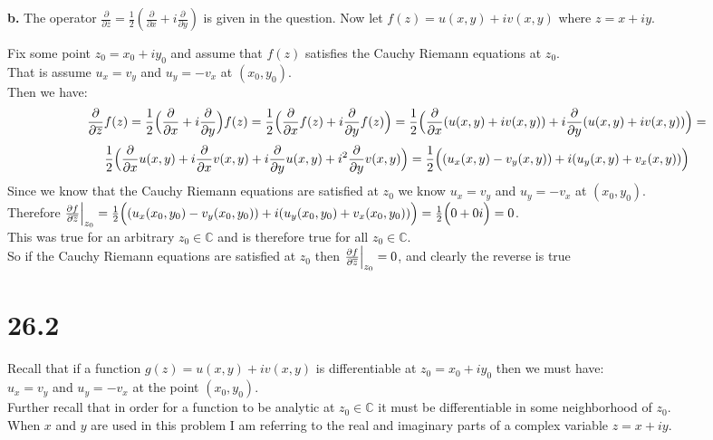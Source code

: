 \documentclass{article}
\begin{document}
{\Large\textbf{b.}} The operator $\frac{\partial}{\partial\overline{z}} =\frac{1}{2} (\frac{\partial}{\partial x} + i\frac{\partial}{\partial y})$ is given in the question. Now let $f(z) = u(x, y) + iv(x, y)$ where $z = x + iy$.
\begin{center}
    \doublespacing
    Fix some point $z_0 = x_0 + iy_0$ and assume that $f(z)$ satisfies the Cauchy Riemann equations at $z_0$.
    \\That is assume $u_x = v_y$ and $u_y = -v_x$ at $(x_0, y_0)$.
    \\Then we have:
    \[\frac{\partial}{\partial\overline{z}} f(z) =\frac{1}{2} \Big{(}\frac{\partial}{\partial x} + i\frac{\partial}{\partial y}\Big{)} f(z) =\frac{1}{2} \Big{(}\frac{\partial}{\partial x} f(z) + i\frac{\partial}{\partial y} f(z)\Big{)} =\frac{1}{2} \Big{(}\frac{\partial}{\partial x} (u(x, y) + iv(x, y)) + i\frac{\partial}{\partial y} (u(x, y) + iv(x, y))\Big{)} =\]
    \[\frac{1}{2} \Big{(}\frac{\partial}{\partial x} u(x, y) + i\frac{\partial}{\partial x}v(x, y) + i\frac{\partial}{\partial y} u(x, y) + i^2\frac{\partial}{\partial y}v(x, y)\Big{)} =\frac{1}{2} \Big{(}(u_x(x, y) - v_y (x, y)) + i(u_y(x, y) + v_x(x, y))\Big{)}\]
    Since we know that the Cauchy Riemann equations are satisfied at $z_0$ we know $u_x = v_y$ and $u_y = -v_x$ at $(x_0, y_0)$.
    \\Therefore $\frac{\partial f}{\partial\overline{z}}\Big{|}_{z_0} =\frac{1}{2} \Big{(}(u_x(x_0, y_0) - v_y (x_0, y_0)) + i(u_y(x_0, y_0) + v_x(x_0, y_0))\Big{)} =\frac{1}{2} \Big{(}0 + 0i\Big{)} = 0$.
    \\This was true for an arbitrary $z_0\in\mathbb{C}$ and is therefore true for all $z_0\in\mathbb{C}$.
    \\So if the Cauchy Riemann equations are satisfied at $z_0$ then $\frac{\partial f}{\partial\overline{z}}\Big{|}_{z_0} = 0$, and clearly the reverse is true \qedsymbol
\end{center}


\newpage
\section*{26.2}
\begin{center}
    \doublespacing
    Recall that if a function $g(z) = u(x, y) + iv(x, y)$ is differentiable at $z_0 = x_0 + i y_0$ then we must have:
    \\$u_x = v_y$ and $u_y = -v_x$ at the point $(x_0, y_0)$.
    \\Further recall that in order for a function to be analytic at $z_0\in\mathbb{C}$ it must be differentiable in some neighborhood of $z_0$.
    \\When $x$ and $y$ are used in this problem I am referring to the real and imaginary parts of a complex variable $z = x + iy$.
\end{center}
\end{document}
